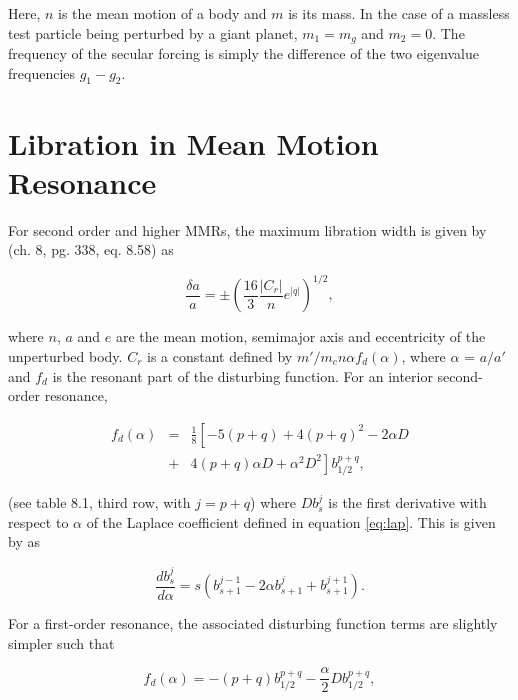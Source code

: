 \documentclass[fleqn,usenatbib]{mnras}
\begin{document}
\noindent Here, $n$ is the mean motion of a body and $m$ is its mass. In the case of a massless test particle being perturbed by a giant planet, $m_{1} = m_{g}$ and $m_{2} = 0$. 
The frequency of the secular forcing is simply the difference of the two eigenvalue frequencies $g_{1} - g_{2}$.

\section{Libration in Mean Motion Resonance}\label{sec:libration}

For second order and higher MMRs, the maximum libration width is given by \citet{1999ssd..book.....M} (ch. 8, pg. 338, eq. 8.58) as

\begin{equation}\label{eq:res_so}
	\frac{\delta a}{a} = \pm \left( \frac{16}{3} \frac{\left| C_{r} \right|}{n} e^{\left| q \right|} \right)^{1/2},
\end{equation}

\noindent where $n$, $a$ and $e$ are the mean motion, semimajor axis and eccentricity of the unperturbed body. $C_{r}$ is a constant defined by 
$m'/m_{c} n \alpha f_{d}(\alpha)$, where $\alpha$ = $a/a'$ and $f_{d}$ is the resonant part of the disturbing function. For an interior second-order 
resonance,

\begin{eqnarray}\label{eq:fd_so}
	f_{d} (\alpha) &=& \frac{1}{8} \left[ -5(p+q) + 4(p+q)^{2} - 2 \alpha D \right. \\ \nonumber
	                      & + & \left. 4(p+q) \alpha D + \alpha^{2} D^{2} \right] b^{p+q}_{1/2},
\end{eqnarray}

\noindent (see \citet{1999ssd..book.....M} table 8.1, third row, with $j = p + q$) where $D b^{j}_{s}$ is the first derivative with respect to $\alpha$ of the Laplace coefficient defined in 
equation \ref{eq:lap}. This is given by \citet{1961mcm..book.....B} as

\begin{equation}\label{eq:lap_d}
	\frac{d b_{s}^{j}}{d \alpha} = s \left( b_{s+1}^{j-1} - 2 \alpha b_{s+1}^{j} + b_{s+1}^{j+1} \right).
\end{equation}

For a first-order resonance, the associated disturbing function terms are slightly simpler such that

\begin{equation}\label{eq:fd_fo}
	f_{d}(\alpha) = -(p+q) b_{1/2}^{p+q} - \frac{\alpha}{2} D b_{1/2}^{p+q},
\end{equation}
\end{document}
